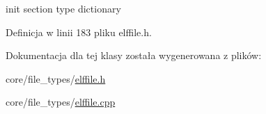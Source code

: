 init section type dictionary 



Definicja w linii 183 pliku elffile.\-h.



Dokumentacja dla tej klasy została wygenerowana z plików\-:\begin{DoxyCompactItemize}
\item 
core/file\-\_\-types/\hyperlink{elffile_8h}{elffile.\-h}\item 
core/file\-\_\-types/\hyperlink{elffile_8cpp}{elffile.\-cpp}\end{DoxyCompactItemize}
